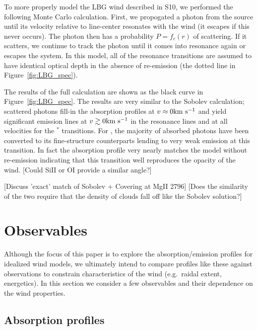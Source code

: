 \documentclass[12pt,preprint]{aastex}
\begin{document}
To more properly model the LBG wind described in S10, we 
performed the following Monte Carlo calculation.  First, we propogated
a photon from the source until its velocity relative to line-center
resonates with the wind (it escapes if this never occurs).
The photon then has a probability $P = f_c(r)$ of scattering.  If it
scatters, we continue to track the photon until it comes into
resonance again or escapes the system.  In this model, all of the
resonance transitions are assumed to have identical optical depth in
the absence of re-emission (the dotted line in
Figure~\ref{fig:LBG_spec}).  

The results of the full calculation are
shown as the black curve in Figure~\ref{fig:LBG_spec}.  The results
are very similar to the Sobolev calculation; scattered photons fill-in
the absorption profiles at $v \approx 0 {\rm km~s^{-1}}$ and yield significant
emission lines at $v \gtrsim 0 {\rm km~s^{-1}}$ in the resonance lines and at
all velocities for the $^*$ transitions.  For \feiia,
the majority of absorbed photons have been converted to its
fine-structure counterparts lending to very weak emission at this
transition. In fact the absorption profile very nearly matches the
model without re-emission indicating that this transition well
reproduces the opacity of the wind.  [Could SiII or OI provide a
similar angle?]

[Discuss 'exact' match of Sobolev + Covering at MgII 2796]
[Does the similarity of the two require that the density of clouds
fall off like the Sobolev solution?]

\section{Observables}

Although the focus of this paper is to explore the absorption/emission
profiles for idealized wind models, we ultimately intend to compare 
profiles like these against observations to constrain characteristics
of the wind (e.g.\ raidal extent, energetics).  In this section we
consider a few observables and their dependence on the wind properties.

\subsection{Absorption profiles}
\end{document}
